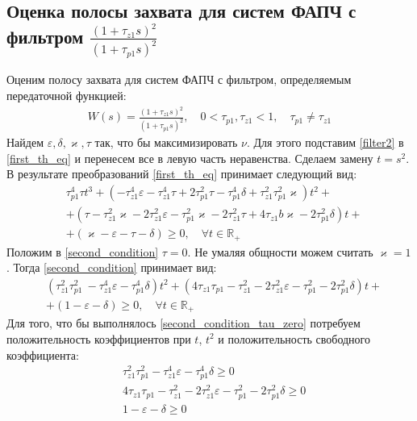 \documentclass[a4paper,article,14pt]{extarticle}
\begin{document}
\subsection{Оценка полосы захвата для систем ФАПЧ с фильтром $\frac{(1+\tau_{z1}s)^2}{(1+\tau_{p1}s)^2}$}
Оценим полосу захвата для систем ФАПЧ с фильтром, определяемым передаточной функцией:
 \begin{equation}\label{filter2}
 \begin{aligned}
W(s) = \frac{(1+\tau_{z1}s)^2}{(1+\tau_{p1}s)^2}, \quad 0<\tau_{p1},\tau_{z1} < 1, \quad \tau_{p1} \neq \tau_{z1}
 \end{aligned}
\end{equation}
Найдем $\varepsilon, \delta, \varkappa, \tau$ так, что бы максимизировать $\nu$. Для этого подставим \eqref{filter2} в \eqref{first_th_eq} и перенесем все в левую часть неравенства. Сделаем замену $t = s^2$. В результате преобразований \eqref{first_th_eq} принимает следующий вид:
 \begin{equation}\label{second_condition}
 \begin{aligned}
&\tau_{p1}^4\tau t^3 +(- \tau_{z1}^4\varepsilon - \tau_{z1}^4\tau + 2\tau_{p1}^2\tau- \tau_{p1}^4\delta + \tau_{z1}^2\tau_{p1}^2\varkappa)t^2 +\\
&+( \tau- \tau_{z1}^2\varkappa - 2\tau_{z1}^2\varepsilon - \tau_{p1}^2\varkappa- 2\tau_{z1}^2\tau + 4\tau_{z1}b\varkappa- 2\tau_{p1}^2\delta)t + \\
&+ (\varkappa-\varepsilon - \tau - \delta)  \geqslant 0, \quad \forall t \in \mathbb{R_+}
 \end{aligned}
\end{equation}
Положим в \eqref{second_condition} $\tau = 0$. Не умаляя общности можем считать $\varkappa = 1$. Тогда \eqref{second_condition} принимает вид:
 \begin{equation}\label{second_condition_tau_zero}
 \begin{aligned}
&(\tau_{z1}^2\tau_{p1}^2\ - \tau_{z1}^4\varepsilon - \tau_{p1}^4\delta)t^2 +( 4\tau_{z1}\tau_{p1} - \tau_{z1}^2 - 2\tau_{z1}^2\varepsilon - \tau_{p1}^2 - 2\tau_{p1}^2\delta)t + \\
&+ (1-\varepsilon - \delta)  \geqslant 0, \quad \forall t \in \mathbb{R_+}
 \end{aligned}
\end{equation}
Для того, что бы выполнялось \eqref{second_condition_tau_zero} потребуем положительность коэффициентов при $t$, $t^2$ и положительность свободного коэффициента: 
 \begin{equation}\label{filter2_1_area}
 \begin{aligned}
&\tau_{z1}^2\tau_{p1}^2 - \tau_{z1}^4\varepsilon - \tau_{p1}^4\delta \geqslant 0\\
&4\tau_{z1}\tau_{p1} - \tau_{z1}^2 - 2\tau_{z1}^2\varepsilon - \tau_{p1}^2 - 2\tau_{p1}^2\delta \geqslant 0\\
&1-\varepsilon - \delta \geqslant 0
 \end{aligned}
\end{equation}
\end{document}

